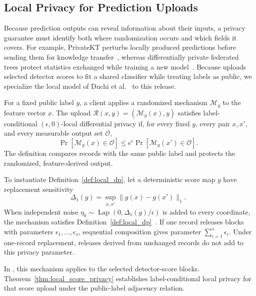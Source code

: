\subsection{Local Privacy for Prediction Uploads}

Because prediction outputs can reveal information about their inputs, a
privacy guarantee must identify both where randomization occurs and which
fields it covers. For example, PrivateKT perturbs locally produced predictions
before sending them for knowledge transfer~\cite{qi2023privatekt}, whereas
differentially private federated trees protect statistics exchanged while
training a new model~\cite{dpfedtree_ccs22}. Because \Fname uploads selected detector
scores to fit a shared classifier while treating labels as public, we
specialize the local model of Duchi et al.~\cite{duchi2013localprivacy} to this
release.

{
\begin{definition}
\label{def:local_dp}
For a fixed public label $y$, a client applies a randomized mechanism
$\mathcal M_y$ to the feature vector $x$. The upload
$\mathcal R(x,y)=(\mathcal M_y(x),y)$ satisfies label-conditional
$(\epsilon,0)$-local differential privacy if, for every fixed $y$, every pair
$x,x'$, and every measurable output set $\mathcal O$,
\begin{equation}
\Pr[\mathcal M_y(x)\in\mathcal O]
\le e^{\epsilon}\Pr[\mathcal M_y(x')\in\mathcal O].
\label{eq:local_dp_definition}
\end{equation}
The definition compares records with the same public label and protects the
randomized, feature-derived output.
\end{definition}
}

To instantiate Definition~\ref{def:local_dp}, let a deterministic score
map $g$ have replacement sensitivity
\begin{equation}
\Delta_1(g)=\sup_{x,x'}\lVert g(x)-g(x')\rVert_1.
\label{eq:local_l1_sensitivity}
\end{equation}
When independent noise
$\eta_k\sim\operatorname{Lap}(0,\Delta_1(g)/\epsilon)$ is added to every
coordinate, the mechanism satisfies
Definition~\ref{def:local_dp}~\cite{dwork2006calibrating}. If one
record releases blocks with parameters $\epsilon_1,\ldots,\epsilon_s$,
sequential composition gives parameter $\sum_{i=1}^{s}\epsilon_i$. Under
one-record replacement, releases derived from unchanged records do not add to
this privacy parameter.

In \Fname, this mechanism applies to the selected detector-score blocks.
Theorem~\ref{thm:local_score_privacy} establishes label-conditional local
privacy for that score upload under the public-label adjacency relation.


